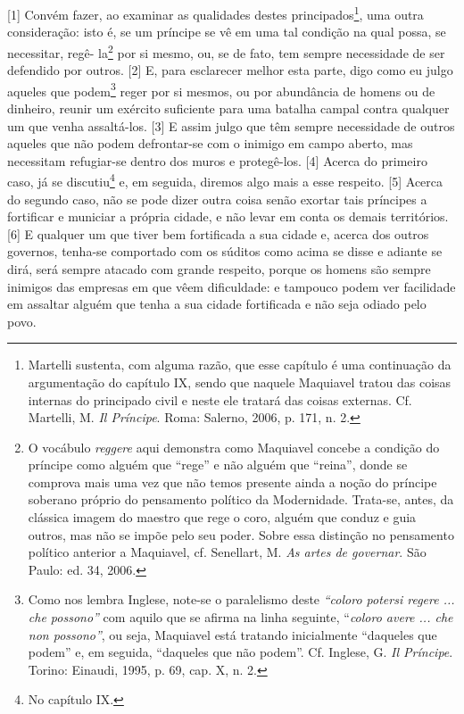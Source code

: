 {[}1{]} Convém fazer, ao examinar as qualidades destes
principados\footnote{Martelli sustenta, com alguma razão, que esse
  capítulo é uma continuação da argumentação do capítulo IX, sendo que
  naquele Maquiavel tratou das coisas internas do principado civil e
  neste ele tratará das coisas externas. Cf. Martelli, M. \emph{Il
  Príncipe}. Roma: Salerno, 2006, p. 171, n. 2.}, uma outra
consideração: isto é, se um príncipe se vê em uma tal condição na qual
possa, se necessitar, regê- la\footnote{O vocábulo \emph{reggere} aqui
  demonstra como Maquiavel concebe a condição do príncipe como alguém
  que ``rege'' e não alguém que ``reina'', donde se comprova mais uma
  vez que não temos presente ainda a noção do príncipe soberano próprio
  do pensamento político da Modernidade. Trata-se, antes, da clássica
  imagem do maestro que rege o coro, alguém que conduz e guia outros,
  mas não se impõe pelo seu poder. Sobre essa distinção no pensamento
  político anterior a Maquiavel, cf. Senellart, M. \emph{As artes de
  governar}. São Paulo: ed. 34, 2006.} por si mesmo, ou, se de fato, tem
sempre necessidade de ser defendido por outros. {[}2{]} E, para
esclarecer melhor esta parte, digo como eu julgo aqueles que
podem\footnote{Como nos lembra Inglese, note-se o paralelismo deste
  \emph{``coloro potersi regere ... che possono''} com aquilo que se
  afirma na linha seguinte, ``\emph{coloro avere ... che non possono''},
  ou seja, Maquiavel está tratando inicialmente ``daqueles que podem''
  e, em seguida, ``daqueles que não podem''. Cf. Inglese, G. \emph{Il
  Príncipe}. Torino: Einaudi, 1995, p. 69, cap. X, n. 2.} reger por si
mesmos, ou por abundância de homens ou de dinheiro, reunir um exército
suficiente para uma batalha campal contra qualquer um que venha
assaltá-los. {[}3{]} E assim julgo que têm sempre necessidade de outros
aqueles que não podem defrontar-se com o inimigo em campo aberto, mas
necessitam refugiar-se dentro dos muros e protegê-los. {[}4{]} Acerca do
primeiro caso, já se discutiu\footnote{No capítulo IX.} e, em seguida,
diremos algo mais a esse respeito. {[}5{]} Acerca do segundo caso, não
se pode dizer outra coisa senão exortar tais príncipes a fortificar e
municiar a própria cidade, e não levar em conta os demais territórios.
{[}6{]} E qualquer um que tiver bem fortificada a sua cidade e, acerca
dos outros governos, tenha-se comportado com os súditos como acima se
disse e adiante se dirá, será sempre atacado com grande respeito, porque
os homens são sempre inimigos das empresas em que vêem dificuldade: e
tampouco podem ver facilidade em assaltar alguém que tenha a sua cidade
fortificada e não seja odiado pelo povo.

